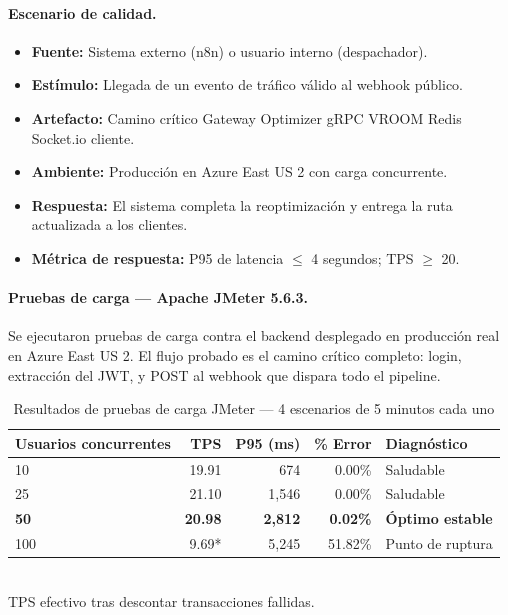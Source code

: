 \documentclass[12pt,a4paper,oneside]{article}
\begin{document}
\paragraph{Escenario de calidad.}
\begin{itemize}[leftmargin=*]
  \item \textbf{Fuente:} Sistema externo (n8n) o usuario interno (despachador).
  \item \textbf{Est\'imulo:} Llegada de un evento de tr\'afico v\'alido al webhook p\'ublico.
  \item \textbf{Artefacto:} Camino cr\'itico Gateway \textrightarrow{} Optimizer gRPC \textrightarrow{} VROOM \textrightarrow{} Redis \textrightarrow{} Socket.io \textrightarrow{} cliente.
  \item \textbf{Ambiente:} Producci\'on en Azure East US 2 con carga concurrente.
  \item \textbf{Respuesta:} El sistema completa la reoptimizaci\'on y entrega la ruta actualizada a los clientes.
  \item \textbf{M\'etrica de respuesta:} P95 de latencia $\leq$ 4 segundos; TPS $\geq$ 20.
\end{itemize}

\paragraph{Pruebas de carga --- Apache JMeter 5.6.3.}
Se ejecutaron pruebas de carga contra el backend desplegado en producci\'on real en Azure East US 2. El flujo probado es el camino cr\'itico completo: login, extracci\'on del JWT, y POST al webhook que dispara todo el pipeline.

\begin{table}[H]
\centering
\caption{Resultados de pruebas de carga JMeter --- 4 escenarios de 5 minutos cada uno}
\label{tab:performance-jmeter}
\small
\begin{tabular}{lrrrl}
\toprule
\textbf{Usuarios concurrentes} & \textbf{TPS} & \textbf{P95 (ms)} & \textbf{\% Error} & \textbf{Diagn\'ostico} \\
\midrule
10  & 19.91 & 674   & 0.00\%  & Saludable \\
25  & 21.10 & 1{,}546 & 0.00\%  & Saludable \\
\textbf{50}  & \textbf{20.98} & \textbf{2{,}812} & \textbf{0.02\%}  & \textbf{\'Optimo estable} \\
100 & 9.69* & 5{,}245 & 51.82\% & Punto de ruptura \\
\bottomrule
\end{tabular}
\\[0.2cm]
\footnotesize *TPS efectivo tras descontar transacciones fallidas.
\end{table}
\end{document}
